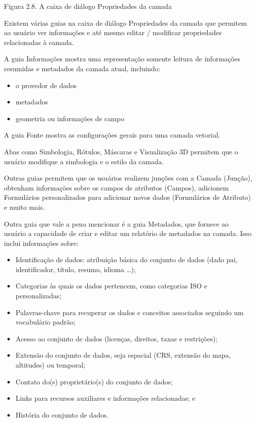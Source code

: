 \documentclass[
  portuguese,
]{krantz}
\providecommand{\tightlist}{%
  \setlength{\itemsep}{0pt}\setlength{\parskip}{0pt}}
\begin{document}
Figura 2.8. A caixa de diálogo Propriedades da camada

Existem várias guias na caixa de diálogo Propriedades da camada que permitem ao usuário ver informações e até mesmo editar / modificar propriedades relacionadas à camada.

A guia Informações mostra uma representação somente leitura de informações resumidas e metadados da camada atual, incluindo:

\begin{itemize}
\tightlist
\item
  o provedor de dados
\item
  metadados
\item
  geometria ou informações de campo
\end{itemize}

A guia Fonte mostra as configurações gerais para uma camada vetorial.

Abas como Simbologia, Rótulos, Máscaras e Visualização 3D permitem que o usuário modifique a simbologia e o estilo da camada.

Outras guias permitem que os usuários realizem junções com a Camada (Junção), obtenham informações sobre os campos de atributos (Campos), adicionem Formulários personalizados para adicionar novos dados (Formulários de Atributo) e muito mais.

Outra guia que vale a pena mencionar é a guia Metadados, que fornece ao usuário a capacidade de criar e editar um relatório de metadados na camada. Isso inclui informações sobre:

\begin{itemize}
\tightlist
\item
  Identificação de dados: atribuição básica do conjunto de dados (dado pai, identificador, título, resumo, idioma \ldots);
\item
  Categorias às quais os dados pertencem, como categorias ISO e personalizadas;
\item
  Palavras-chave para recuperar os dados e conceitos associados seguindo um vocabulário padrão;
\item
  Acesso ao conjunto de dados (licenças, direitos, taxas e restrições);
\item
  Extensão do conjunto de dados, seja espacial (CRS, extensão do mapa, altitudes) ou temporal;
\item
  Contato do(s) proprietário(s) do conjunto de dados;
\item
  Links para recursos auxiliares e informações relacionadas; e
\item
  História do conjunto de dados.
\end{itemize}
\end{document}
